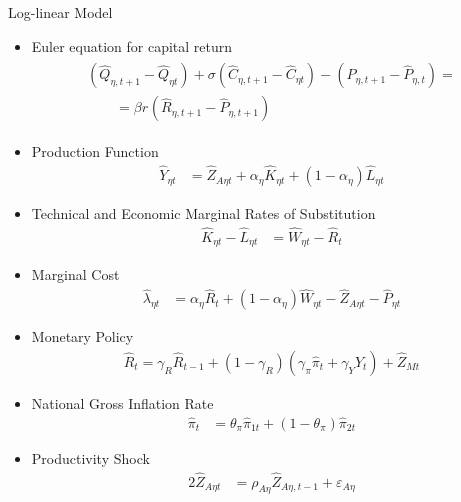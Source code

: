 \documentclass[../quali_slides.tex]{subfiles}
\begin{document}
\begin{frame}[allowframebreaks]{Log-linear Model}
{\begin{itemize}
		\item Euler equation for capital return
		\begin{align}
			\begin{split}
				(\hat{Q}_{\eta, t+1} - \hat{Q}_{\eta t}) + \sigma(\hat{C}_{\eta, t+1} - \hat{C}_{\eta t}) - (\hat{P}_{\eta, t+1} - \hat{P}_{\eta, t}) = \\
				\qquad = \beta r_{}(\hat{R}_{\eta, t+1} - \hat{P}_{\eta, t+1})
			\end{split} \label{eq_v2:reg-ll-capital-euler-equation}
		\end{align}
		
		\item Production Function
		\begin{align}
			\hat{Y}_{\eta t} &= \hat{Z}_{A\eta t} + {\alpha_{\eta}} \hat{K}_{\eta t} + (1-\alpha_{\eta}) \hat{L}_{\eta t} \label{eq_v2:reg-ll-final-goods-firm-bundle-rule-3}
		\end{align}
		
		\item Technical and Economic Marginal Rates of Substitution %
		\begin{align}
			\hat{K}_{\eta t} - \hat{L}_{\eta t} &= \hat{W}_{\eta t} - \hat{R}_{t} \label{eq_v2:reg-ll-int-good-firm-TMRS}
		\end{align}
		
		\item Marginal Cost
		\begin{align}
			\hat{\lambda}_{\eta t} &= {\alpha_{\eta}} \hat{R}_{t} + (1- {\alpha_{\eta}}) \hat{W}_{\eta t} - \hat{Z}_{A\eta t} - \hat{P}_{\eta t} \label{eq_v2:reg-ll-int-good-firm-MC-3}
		\end{align}
		
		\item Monetary Policy
		\begin{align}
			\hat{R}_t = \gamma_{R} \hat{R}_{t-1} + (1-\gamma_{R})(\gamma_{\pi} \hat{\pi}_t + \gamma_{Y} \hat{Y}_t) + \hat{Z}_{Mt} \label{eq_v2:reg-ll-monetary-policy}
		\end{align}
		
		\item National Gross Inflation Rate
		\begin{align}
			\hat{\pi}_{t} &= \theta_{\pi} \hat{\pi}_{1t} + (1 - \theta_{\pi}) \hat{\pi}_{2t} \label{eq_v2:reg-gross-inflation-rate-ll}
		\end{align}
		
		\item Productivity Shock
		\begin{alignat}{2}
			\hat{Z}_{A\eta t} &= \rho_{A\eta} \hat{Z}_{A\eta, t-1} + \varepsilon_{A\eta} \label{eq_v2:reg-ll-productivity-shock}
		\end{alignat}
		

\end{itemize}}
\end{frame}
\end{document}
